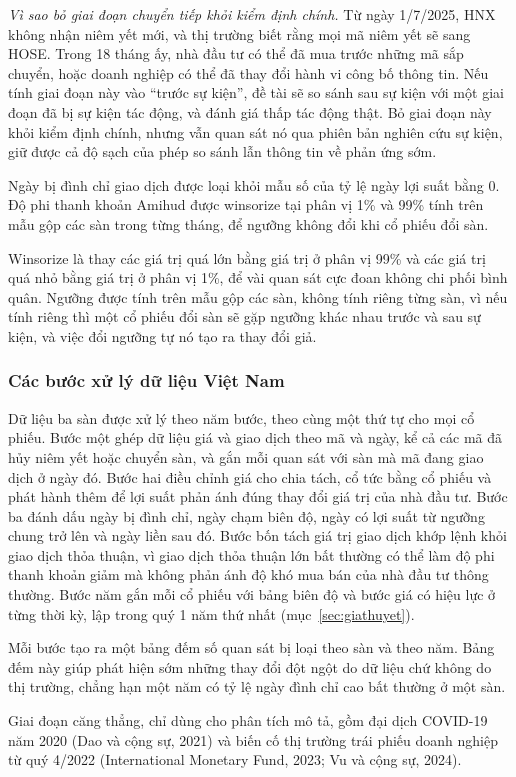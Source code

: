 \begin{vidao}
\emph{Vì sao bỏ giai đoạn chuyển tiếp khỏi kiểm định chính.} Từ ngày 1/7/2025, HNX không nhận niêm yết mới, và thị trường biết rằng mọi mã niêm yết sẽ sang HOSE. Trong 18 tháng ấy, nhà đầu tư có thể đã mua trước những mã sắp chuyển, hoặc doanh nghiệp có thể đã thay đổi hành vi công bố thông tin. Nếu tính giai đoạn này vào \enquote{trước sự kiện}, đề tài sẽ so sánh sau sự kiện với một giai đoạn đã bị sự kiện tác động, và đánh giá thấp tác động thật. Bỏ giai đoạn này khỏi kiểm định chính, nhưng vẫn quan sát nó qua phiên bản nghiên cứu sự kiện, giữ được cả độ sạch của phép so sánh lẫn thông tin về phản ứng sớm.
\end{vidao}

Ngày bị đình chỉ giao dịch được loại khỏi mẫu số của tỷ lệ ngày lợi suất bằng 0. Độ phi thanh khoản Amihud được winsorize tại phân vị 1\% và 99\% tính trên mẫu gộp các sàn trong từng tháng, để ngưỡng không đổi khi cổ phiếu đổi sàn.

Winsorize là thay các giá trị quá lớn bằng giá trị ở phân vị 99\% và các giá trị quá nhỏ bằng giá trị ở phân vị 1\%, để vài quan sát cực đoan không chi phối bình quân. Ngưỡng được tính trên mẫu gộp các sàn, không tính riêng từng sàn, vì nếu tính riêng thì một cổ phiếu đổi sàn sẽ gặp ngưỡng khác nhau trước và sau sự kiện, và việc đổi ngưỡng tự nó tạo ra thay đổi giả.

\subsubsection*{Các bước xử lý dữ liệu Việt Nam}

Dữ liệu ba sàn được xử lý theo năm bước, theo cùng một thứ tự cho mọi cổ phiếu. Bước một ghép dữ liệu giá và giao dịch theo mã và ngày, kể cả các mã đã hủy niêm yết hoặc chuyển sàn, và gắn mỗi quan sát với sàn mà mã đang giao dịch ở ngày đó. Bước hai điều chỉnh giá cho chia tách, cổ tức bằng cổ phiếu và phát hành thêm để lợi suất phản ánh đúng thay đổi giá trị của nhà đầu tư. Bước ba đánh dấu ngày bị đình chỉ, ngày chạm biên độ, ngày có lợi suất từ ngưỡng chung trở lên và ngày liền sau đó. Bước bốn tách giá trị giao dịch khớp lệnh khỏi giao dịch thỏa thuận, vì giao dịch thỏa thuận lớn bất thường có thể làm độ phi thanh khoản giảm mà không phản ánh độ khó mua bán của nhà đầu tư thông thường. Bước năm gắn mỗi cổ phiếu với bảng biên độ và bước giá có hiệu lực ở từng thời kỳ, lập trong quý 1 năm thứ nhất (mục~\ref{sec:giathuyet}).

Mỗi bước tạo ra một bảng đếm số quan sát bị loại theo sàn và theo năm. Bảng đếm này giúp phát hiện sớm những thay đổi đột ngột do dữ liệu chứ không do thị trường, chẳng hạn một năm có tỷ lệ ngày đình chỉ cao bất thường ở một sàn.


Giai đoạn căng thẳng, chỉ dùng cho phân tích mô tả, gồm đại dịch COVID-19 năm 2020 (Dao và cộng sự, 2021) và biến cố thị trường trái phiếu doanh nghiệp từ quý 4/2022 (International Monetary Fund, 2023; Vu và cộng sự, 2024).
